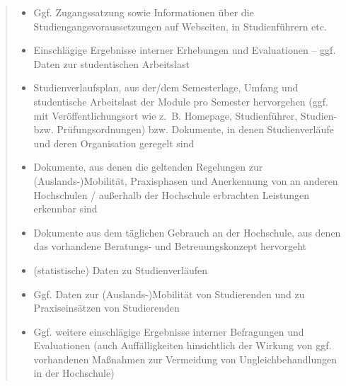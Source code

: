 \begin{quote}
\begin{itemize}
\item
  Ggf. Zugangssatzung sowie Informationen über die
  Studiengangsvoraussetzungen auf Webseiten, in Studienführern etc.
\item
  Einschlägige Ergebnisse interner Erhebungen und Evaluationen -- ggf.
  Daten zur studentischen Arbeitslast
\item
  Studienverlaufsplan, aus der/dem Semesterlage, Umfang und studentische
  Arbeitslast der Module pro Semester hervorgehen (ggf. mit
  Veröffentlichungsort wie z.~B. Homepage, Studienführer, Studien- bzw.
  Prüfungsordnungen) bzw. Dokumente, in denen Studienverläufe und deren
  Organisation geregelt sind
\item
  Dokumente, aus denen die geltenden Regelungen zur
  (Auslands-)Mobilität, Praxisphasen und Anerkennung von an anderen
  Hochschulen / außerhalb der Hochschule erbrachten Leistungen erkennbar
  sind
\item
  Dokumente aus dem täglichen Gebrauch an der Hochschule, aus denen das
  vorhandene Beratungs- und Betreuungskonzept hervorgeht
\item
  (statistische) Daten zu Studienverläufen
\item
  Ggf. Daten zur (Auslands-)Mobilität von Studierenden und zu
  Praxiseinsätzen von Studierenden
\item
  Ggf. weitere einschlägige Ergebnisse interner Befragungen und
  Evaluationen (auch Auffälligkeiten hinsichtlich der Wirkung von ggf.
  vorhandenen Maßnahmen zur Vermeidung von Ungleichbehandlungen in der
  Hochschule)
\end{itemize}
\end{quote}

